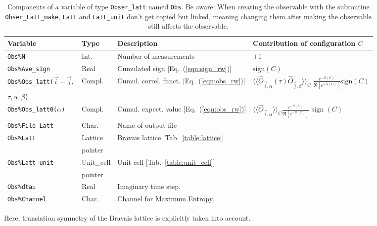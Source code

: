 \begin{table}[h]
	\begin{center}
	\begin{tabular}{@{} l l l l @{}}\toprule
		Variable  &  Type      &  Description &  Contribution of configuration $C$ \\\midrule
		\texttt{Obs\%N}                       &  Int.        &   Number of measurements &    $+1$\\
		\texttt{Obs\%Ave\_sign}  
		&  Real  &    Cumulated sign [Eq.~(\ref{eqn:sign_rw})] & $\text{sign}(C)$  \\
		\texttt{Obs\%Obs\_latt($\vec{i}-\vec{j},$}        & Compl.      &    Cumul.  correl. funct. [Eq.~(\ref{eqn:obs_rw})] &  $ \langle \langle \hat{O}_{\vec{i},\alpha} (\tau) \hat{O}_{\vec{j},\beta} \rangle \rangle_{C} \; \frac{e^{-S(C)}} {\Re \left[e^{-S(C)} \right]}  \text{sign}(C) $ \vspace{-4pt} \\
		\hfill \texttt{$\tau,\alpha,\beta$)} & & & \\
		\texttt{Obs\%Obs\_latt0($\alpha$)}        & Compl.      &    Cumul. expect. value [Eq.~(\ref{eqn:obs_rw})] &   $ \langle \langle \hat{O}_{\vec{i},\alpha} \rangle \rangle_{C}\frac{e^{-S(C)}} {\Re \left[e^{-S(C)} \right]}  \text{ sign }(C) $ \\
		\texttt{Obs\%File\_Latt}           &  Char.    &    Name of output file  &
		\\
		\texttt{Obs\%Latt} & Lattice & Bravais lattice [Tab.~\ref{table:lattice}] \\
		& pointer
		\\
		\texttt{Obs\%Latt\_unit} & Unit\_cell & Unit cell [Tab.~\ref{table:unit_cell}] \\
		& pointer
		\\
		\texttt{Obs\%dtau} & Real & Imaginary time step.
		\\
		\texttt{Obs\%Channel} & Char. & Channel for Maximum Entropy.
		\\\bottomrule
	\end{tabular}
	\caption{Components of a variable of type \texttt{Obser\_latt} named \texttt{Obs}.
	Be aware: When creating the observable with the subroutine \texttt{Obser\_Latt\_make},
	\texttt{Latt} and \texttt{Latt\_unit} don't get copied but linked, meaning changing them after making the 
	observable still affects the observable.}
	\label{table:Obser_latt}
\end{center}
\end{table}
%
Here,  translation symmetry of the Bravais lattice is explicitly taken into account. 
